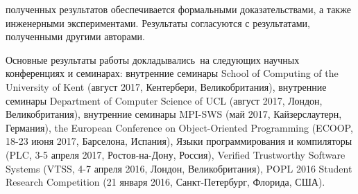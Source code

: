     
    

{\reliability} полученных результатов обеспечивается формальными доказательствами,
а также инженерными экспериментами.
Результаты согласуются с результатами, полученными другими авторами.

{\probation}
Основные результаты работы докладывались~на следующих научных конференциях и семинарах:
внутренние семинары School of Computing of the University of Kent (август 2017, Кентербери, Великобритания),
внутренние семинары Department of Computer Science of UCL (август 2017, Лондон, Великобритания),
внутренние семинары MPI-SWS (май 2017, Кайзерслаутерн, Германия),
the European Conference on Object-Oriented Programming (ECOOP, 18-23 июня 2017, Барселона, Испания),
Языки программирования и компиляторы (PLC, 3-5 апреля 2017, Ростов-на-Дону, Россия),
Verified Trustworthy Software Systems (VTSS, 4-7 апреля 2016, Лондон, Великобритания),
POPL 2016 Student Research Competition (21 января 2016, Санкт-Петербург, Флорида, США).



